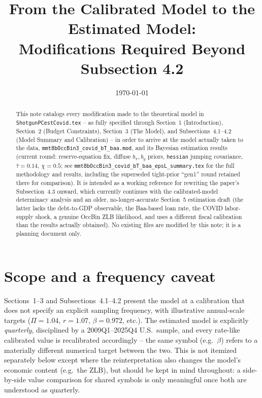 \documentclass[11pt]{article}
\title{From the Calibrated Model to the Estimated Model:\\
Modifications Required Beyond Subsection 4.2}
\author{}
\date{\today}
\begin{document}
\maketitle

\begin{abstract}
This note catalogs every modification made to the theoretical model in
\texttt{ShotgunPCestCovid.tex} -- as fully specified through Section~1
(Introduction), Section~2 (Budget Constraints), Section~3 (The Model),
and Subsections~4.1--4.2 (Model Summary and Calibration) -- in order to
arrive at the model actually taken to the data,
\texttt{mmt8bOccBin3\_covid\_bT\_baa.mod}, and its Bayesian estimation
results (current round: reserve-equation fix, diffuse $b_\pi,b_y$
priors, \texttt{hessian} jumping covariance, $\bar\tau=0.14$, $\chi=0.5$;
see \texttt{mmt8bOccBin3\_covid\_bT\_baa\_epsL\_summary.tex} for the full
methodology and results, including the superseded tight-prior ``gen1''
round retained there for comparison). It is intended as a working
reference for rewriting the paper's Subsection~4.3 onward, which
currently continues with the calibrated-model determinacy analysis and
an older, no-longer-accurate Section~5 estimation draft (the latter
lacks the debt-to-GDP observable, the Baa-based loan rate, the COVID
labor-supply shock, a genuine OccBin ZLB likelihood, and uses a
different fiscal calibration than the results actually obtained). No
existing files are modified by this note; it is a planning document only.
\end{abstract}

\tableofcontents

\section{Scope and a frequency caveat}

Sections~1--3 and Subsections~4.1--4.2 present the model at a
calibration that does not specify an explicit sampling frequency, with
illustrative annual-scale targets ($\Pi=1.04$, $r=1.07$, $\beta=0.972$,
etc.). The estimated model is explicitly \emph{quarterly}, disciplined
by a 2009Q1--2025Q4 U.S.\ sample, and every rate-like calibrated value
is recalibrated accordingly -- the same symbol (e.g.\ $\beta$) refers to
a materially different numerical target between the two. This is not
itemized separately below except where the reinterpretation also
changes the model's economic content (e.g.\ the ZLB), but should be
kept in mind throughout: a side-by-side value comparison for shared
symbols is only meaningful once both are understood as quarterly.
\end{document}
